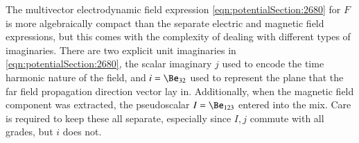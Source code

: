 {The multivector electrodynamic field expression
\cref{eqn:potentialSection:2680} for
\( F \) is more algebraically compact than the separate electric and magnetic field expressions, but this comes with the complexity of dealing with different types of imaginaries.
There are two explicit unit imaginaries in \cref{eqn:potentialSection:2680}, the scalar imaginary \( j \) used to encode the time harmonic nature of the field, and \( i = \Be_{32} \) used to represent the plane that the far field propagation direction vector lay in.
Additionally, when the magnetic field component was extracted, the pseudoscalar \( I = \Be_{123} \) entered into the mix.
Care is required to keep these all separate, especially since \( I, j \) commute with all grades, but \( i \) does not.
} %

